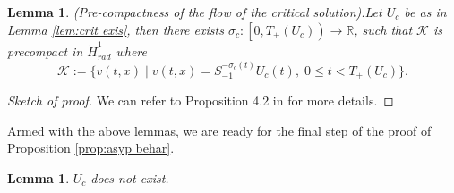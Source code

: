 \documentclass[reqno, 11pt]{amsart}
\numberwithin{equation}{section}
\newcommand{\R}{\mathbb{R}}
\theoremstyle{plain}
\newtheorem{lemma}[theorem]{Lemma}
\theoremstyle{definition}
\numberwithin{equation}{section}
\numberwithin{theorem}{section}
\numberwithin{equation}{section}
\numberwithin{equation}{section}
\numberwithin{theorem}{section}
\begin{document}
	\begin{lemma}(Pre-compactness of the flow of the critical solution).\label{lem:crit comp} Let $U_c$ be as in Lemma \ref{lem:crit exis}, then there exists $\sigma_{c}:\left[0,T_+(U_c) \right)\to \R$, such that $\mathscr{K}$ is precompact in $\dot H_{rad}^1$ where
		\begin{equation*}
		\mathscr{K}:=\{v(t,x)\;|\;v(t,x)=S_{-1}^{-\sigma_{c}(t)}U_c(t),\;0\leq t<T_+(U_c) \}.
		\end{equation*}
	\end{lemma}
	\begin{proof}[Sketch of proof]
		We can refer to Proposition 4.2 in \cite{MXZ:crit Hart:f rad} for more details.
	\end{proof}
	Armed with the above lemmas, we are ready for the final step of the proof of Proposition \ref{prop:asyp behar}.
	\begin{lemma} $U_c$ does not exist.
	\end{lemma}
\end{document}
